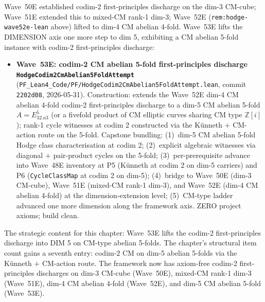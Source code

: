 \begin{remark}\label{rem:hodge-wave53e-lean}
Wave~50E established codim-2 first-principles discharge on the dim-3 CM-cube; Wave~51E extended this to mixed-CM rank-1 dim-3; Wave~52E (\texttt{rem:hodge-wave52e-lean} above) lifted to dim-4 CM abelian 4-fold. Wave~53E lifts the DIMENSION axis one more step to dim 5, exhibiting a CM abelian 5-fold instance with codim-2 first-principles discharge:
\begin{itemize}
  \item \textbf{Wave~53E: codim-2 CM abelian 5-fold first-principles discharge \texttt{HodgeCodim2CmAbelian5FoldAttempt}} (\texttt{PF\_Lean4\_Code/PF/HodgeCodim2CmAbelian5FoldAttempt.lean}, commit \texttt{2202d08}, 2026-05-31). Construction: extends the Wave~52E dim-4 CM abelian 4-fold codim-2 first-principles discharge to a dim-5 CM abelian 5-fold $A = E_{32.a3}^5$ (or a fivefold product of CM elliptic curves sharing CM type $\mathbb{Z}[i]$); rank-1 cycle witnesses at codim 2 constructed via the K\"unneth $+$ CM-action route on the 5-fold. Capstone bundling: (1)~dim-5 CM abelian 5-fold Hodge class characterisation at codim 2; (2)~explicit algebraic witnesses via diagonal $+$ pair-product cycles on the 5-fold; (3)~per-prerequisite advance into Wave~48E inventory at P5 (K\"unneth at codim 2 on dim-5 carriers) and P6 (\texttt{CycleClassMap} at codim 2 on dim-5); (4)~bridge to Wave~50E (dim-3 CM-cube), Wave~51E (mixed-CM rank-1 dim-3), and Wave~52E (dim-4 CM abelian 4-fold) at the dimension-extension level; (5)~CM-type ladder advanced one more dimension along the framework axis. ZERO project axioms; build clean.
\end{itemize}
The strategic content for this chapter: Wave~53E lifts the codim-2 first-principles discharge into DIM 5 on CM-type abelian 5-folds. The chapter's structural item count gains a seventh entry: codim-$2$ CM on dim-5 abelian 5-folds via the K\"unneth $+$ CM-action route. The framework now has axiom-free codim-2 first-principles discharges on dim-3 CM-cube (Wave~50E), mixed-CM rank-1 dim-3 (Wave~51E), dim-4 CM abelian 4-fold (Wave~52E), and dim-5 CM abelian 5-fold (Wave~53E).


\end{remark}
